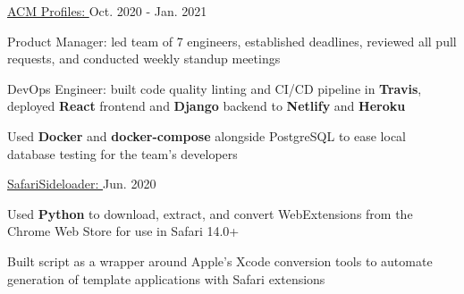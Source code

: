 
\begin{cventries}

  \cvproject
  {\href{https://elated-pike-6f8e56.netlify.app/}{ACM Profiles: }} %
  {Oct. 2020 - Jan. 2021} %
  {
    \begin{cvitems} %
      \item {Product Manager: led team of 7 engineers, established deadlines, reviewed all pull requests, and conducted weekly standup meetings}
      \item {DevOps Engineer: built code quality linting and CI/CD pipeline in \textbf{Travis}, deployed \textbf{React} frontend and \textbf{Django} backend to \textbf{Netlify} and \textbf{Heroku}}
      \item {Used \textbf{Docker} and \textbf{docker-compose} alongside PostgreSQL to ease local database testing for the team's developers}
    \end{cvitems}
  }

  \cvproject
    {\href{https://github.com/hexalellogram/SafariSideloader}{SafariSideloader: }} %
    {Jun. 2020} %
    {
      \begin{cvitems} %
        \item {Used \textbf{Python} to download, extract, and convert WebExtensions from the Chrome Web Store for use in Safari 14.0+}
        \item {Built script as a wrapper around Apple's Xcode conversion tools to automate generation of template applications with Safari extensions}
      \end{cvitems}
    }


\end{cventries}
